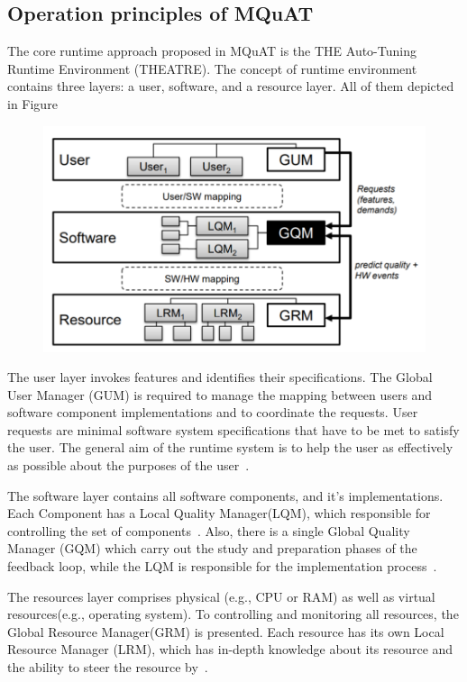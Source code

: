 \subsection{Operation principles of MQuAT}
The core runtime approach proposed in MQuAT is the THE Auto-Tuning Runtime Environment (THEATRE)\cite{gotz10, gotz12}.
The concept of runtime environment contains three layers: a user, software, and a resource layer. All of them depicted in Figure ~\label{fig:threelayersmquat}
\begin{figure}
	\centering
	\includegraphics[width=\textwidth]{images/ThreeLayersMQuAT}
	\caption[Layers of MQuAT]{}
	\label{fig:threelayersmquat}
\end{figure}

The user layer invokes features and identifies their specifications. The  Global  User  Manager  (GUM)  is required to manage the mapping between users and software component implementations and to coordinate the requests. User requests are minimal software system specifications that have to be met to satisfy the user. The general aim of the runtime system is to help the user as effectively as possible about the purposes of the user~\cite{gotz13}.

The software layer contains all software components, and it's implementations. Each Component has a Local Quality Manager(LQM), which responsible for controlling the set of components~\cite{gotz13, ahmad18}. Also, there is a single Global Quality Manager (GQM) which carry out the study and preparation phases of the feedback loop, while the LQM is responsible for the implementation process~\cite{gotz13}.

The resources layer comprises physical (e.g., CPU or RAM) as well as virtual resources(e.g., operating system).
To controlling and monitoring all resources, the Global Resource Manager(GRM) is presented. Each resource has its own Local Resource Manager (LRM), which has in-depth knowledge about its resource and the ability to steer the resource by~\cite{gotz13, ahmad18}.

